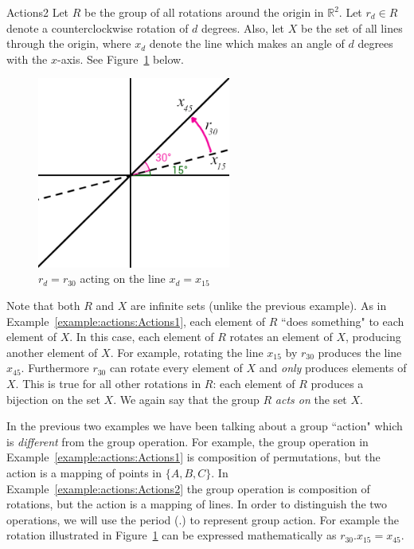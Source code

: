 \begin{example}{Actions2} Let $R$ be the group of all rotations around the origin in $\mathbb{R}^2$. Let $r_d\in R$ denote a counterclockwise rotation of $d$ degrees. Also, let $X$ be the set of all lines through the origin, where $x_d$ denote the line which makes an angle of $d$ degrees with the $x$-axis. See Figure~\ref{fig:rotate_line} below.

\begin{figure}[htbp]
\begin{center}
\includegraphics[width=2.5in]{images/rotate_line.png}
\caption{$r_d=r_{30}$ acting on the line $x_d=x_{15}$}\label{fig:rotate_line}
\end{center}
\end{figure}

Note that both $R$ and $X$ are infinite sets (unlike the previous example). As in Example~\ref{example:actions:Actions1}, each element of $R$ ``does something" to each element of $X$. In this case, each element of $R$ rotates an element of $X$, producing another element of $X$. For example, rotating the line $x_{15}$ by $r_{30}$ produces the line $x_{45}$. Furthermore $r_{30}$ can rotate every element of $X$ and \emph{only} produces elements of $X$. This is true for all other rotations in $R$: each element of $R$ produces a bijection on the set $X$. We again say that the group $R$ \emph{acts on} the set $X$.
\end {example}

In the previous two examples we have been talking about a group ``action" which is \emph{different} from the group operation.  For example, the group operation in Example~\ref{example:actions:Actions1} is composition of permutations, but the action is a mapping of points in $\{A,B,C\}$. In Example~\ref{example:actions:Actions2} the group operation is composition of rotations, but the action is a mapping of lines. In order to distinguish the two operations, we will use the period (.) to represent group action. For example the rotation illustrated in Figure~\ref{fig:rotate_line} can be expressed mathematically as $r_{30}.x_{15}=x_{45}$.

